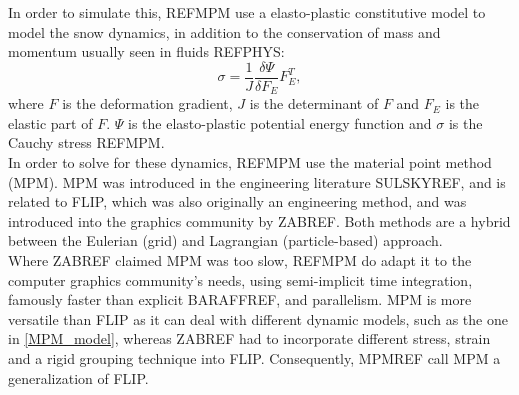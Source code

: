 In order to simulate this, REFMPM use a elasto-plastic constitutive model to model the snow dynamics, in addition to the conservation of mass and momentum usually seen in fluids REFPHYS:
\begin{equation} \label{MPM_model}
\sigma = \frac{1}{J} \frac{\delta \Psi}{\delta F_E} F_E^T,
\end{equation}
where $F$ is the deformation gradient, $J$ is the determinant of $F$ and $F_E$ is the elastic part of $F$. $\Psi$ is the elasto-plastic potential energy function and $\sigma$ is the Cauchy stress REFMPM.\\

In order to solve for these dynamics, REFMPM use the material point method (MPM). MPM was introduced in the engineering literature SULSKYREF, and is related to FLIP, which was also originally an engineering method, and was introduced into the graphics community by ZABREF. Both methods are a hybrid between the Eulerian (grid) and Lagrangian (particle-based) approach.\\

Where ZABREF claimed MPM was too slow, REFMPM do adapt it to the computer graphics community's needs, using semi-implicit time integration, famously faster than explicit BARAFFREF, and parallelism. MPM is more versatile than FLIP as it can deal with different dynamic models, such as the one in \eqref{MPM_model}, whereas ZABREF had to incorporate different stress, strain and a rigid grouping technique into FLIP. Consequently, MPMREF call MPM a generalization of FLIP.\\


\ifx\isEmbedded\undefined


\pagebreak

\fi
